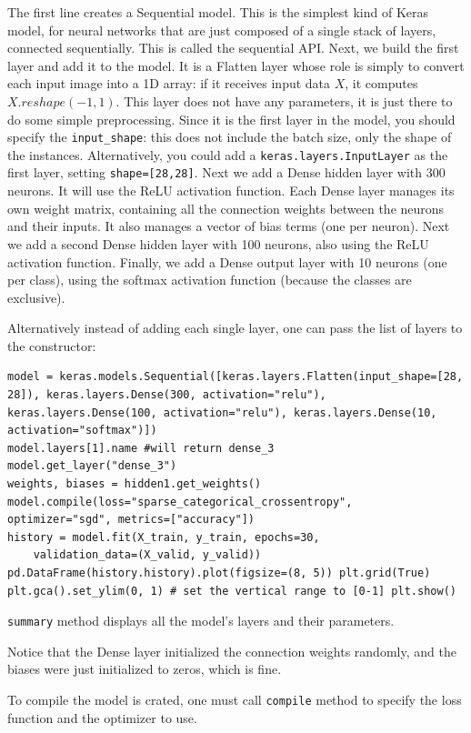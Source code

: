\documentclass[12pt, letterpaper]{article}
\theoremstyle{definition}
\begin{document}
The first line creates a Sequential model. This is the simplest kind of Keras model, for neural networks that are just composed of a single stack of layers, connected sequentially. This is called the sequential API. Next, we build the first layer and add it to the model. It is a Flatten layer whose role is simply to convert each input image into a 1D array: if it receives input data $X$, it computes $X.reshape(-1, 1)$. This layer does not have any parameters, it is just there to do some simple preprocessing. Since it is the first layer in the model, you should specify the \lstinline+input_shape+: this does not include the batch size, only the shape of the instances. Alternatively, you could add a \lstinline+keras.layers.InputLayer+ as the first layer, setting \lstinline+shape=[28,28]+. Next we add a Dense hidden layer with 300 neurons. It will use the ReLU activation function. Each Dense layer manages its own weight matrix, containing all the connection weights between the neurons and their inputs. It also manages a vector of bias terms (one per neuron). Next we add a second Dense hidden layer with 100 neurons, also using the ReLU activation function. Finally, we add a Dense output layer with 10 neurons (one per class), using the softmax activation function (because the classes are exclusive).

Alternatively instead of adding each single layer, one can pass the list of layers to the constructor:
\begin{lstlisting}
model = keras.models.Sequential([keras.layers.Flatten(input_shape=[28, 28]), keras.layers.Dense(300, activation="relu"), keras.layers.Dense(100, activation="relu"), keras.layers.Dense(10, activation="softmax")])
model.layers[1].name #will return dense_3
model.get_layer("dense_3")
weights, biases = hidden1.get_weights()
model.compile(loss="sparse_categorical_crossentropy",  optimizer="sgd", metrics=["accuracy"])
history = model.fit(X_train, y_train, epochs=30,
    validation_data=(X_valid, y_valid))
pd.DataFrame(history.history).plot(figsize=(8, 5)) plt.grid(True)
plt.gca().set_ylim(0, 1) # set the vertical range to [0-1] plt.show()
\end{lstlisting}

\lstinline+summary+ method displays all the model's layers and their parameters.

Notice that the Dense layer initialized the connection weights randomly, and the biases were just initialized to zeros, which is fine.

To compile the model is crated, one must call \lstinline+compile+ method to specify the loss function and the optimizer to use.
\end{document}
